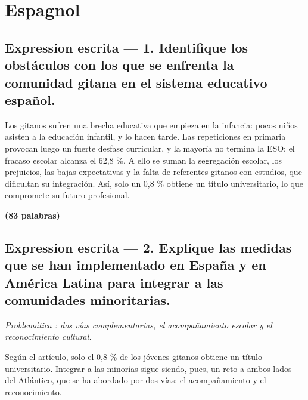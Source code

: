 \documentclass[11pt,a4paper]{article}
\begin{document}
\hypertarget{espagnol}{%
\section{Espagnol}\label{espagnol}}

\hypertarget{expression-escrita-1.-identifique-los-obstuxe1culos-con-los-que-se-enfrenta-la-comunidad-gitana-en-el-sistema-educativo-espauxf1ol.}{%
\subsection{Expression escrita --- 1. Identifique los obstáculos con los que se enfrenta la comunidad gitana en el sistema educativo español.}\label{expression-escrita-1.-identifique-los-obstuxe1culos-con-los-que-se-enfrenta-la-comunidad-gitana-en-el-sistema-educativo-espauxf1ol.}}

Los gitanos sufren una brecha educativa que empieza en la infancia: pocos niños asisten a la educación infantil, y lo hacen tarde. Las repeticiones en primaria provocan luego un fuerte desfase curricular, y la mayoría no termina la ESO: el fracaso escolar alcanza el 62,8 \%. A ello se suman la segregación escolar, los prejuicios, las bajas expectativas y la falta de referentes gitanos con estudios, que dificultan su integración. Así, solo un 0,8 \% obtiene un título universitario, lo que compromete su futuro profesional.

\textbf{(83 palabras)}

\hypertarget{expression-escrita-2.-explique-las-medidas-que-se-han-implementado-en-espauxf1a-y-en-amuxe9rica-latina-para-integrar-a-las-comunidades-minoritarias.}{%
\subsection{Expression escrita --- 2. Explique las medidas que se han implementado en España y en América Latina para integrar a las comunidades minoritarias.}\label{expression-escrita-2.-explique-las-medidas-que-se-han-implementado-en-espauxf1a-y-en-amuxe9rica-latina-para-integrar-a-las-comunidades-minoritarias.}}

\emph{Problemática : dos vías complementarias, el acompañamiento escolar y el reconocimiento cultural.}

Según el artículo, solo el 0,8 \% de los jóvenes gitanos obtiene un título universitario. Integrar a las minorías sigue siendo, pues, un reto a ambos lados del Atlántico, que se ha abordado por dos vías: el acompañamiento y el reconocimiento.
\end{document}
